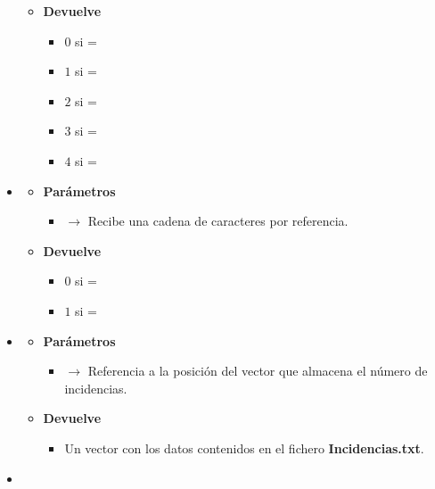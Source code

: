 \begin{itemize}
\begin{itemize}
\begin{itemize}
		\end{itemize}
		\item \textbf{Devuelve}
		\begin{itemize}
			\item $0$ si  = 
			\item $1$ si  = 
			\item $2$ si  = 
			\item $3$ si  = 
			\item $4$ si  = 
		\end{itemize}
	\end{itemize}
	\item\label{def:idavuelta}
	\begin{itemize}
		\item \textbf{Parámetros}
		\begin{itemize}
			\item {} $\rightarrow$ Recibe una cadena de caracteres por referencia.
		\end{itemize}
		\item \textbf{Devuelve}
		\begin{itemize}
			\item $0$ si  = 
			\item $1$ si  = 
		\end{itemize}
	\end{itemize}
	\item\label{def:initincidencias}
	\begin{itemize}
		\item \textbf{Parámetros}
		\begin{itemize}
			\item {} $\rightarrow$ Referencia a la posición del vector que almacena el número de incidencias.
		\end{itemize}
		\item \textbf{Devuelve}
		\begin{itemize}
			\item Un vector con los datos contenidos en el fichero \textbf{Incidencias.txt}.
		\end{itemize}
	\end{itemize}
	\item\label{def:initpasos}
	\begin{itemize}

\end{itemize}
\end{itemize}
